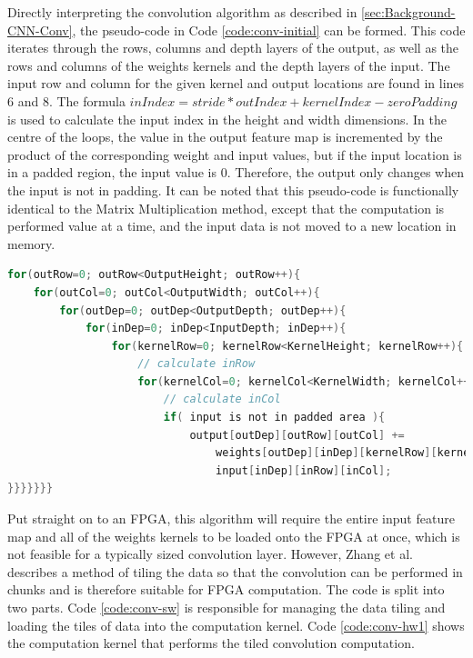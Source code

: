 \documentclass[12pt]{article}
\begin{document}
Directly interpreting the convolution algorithm as described in \ref{sec:Background-CNN-Conv}, the pseudo-code in Code \ref{code:conv-initial} can be formed. This code iterates through the rows, columns and depth layers of the output, as well as the rows and columns of the weights kernels and the depth layers of the input. The input row and column for the given kernel and output locations are found in lines 6 and 8. The formula $inIndex = stride * outIndex + kernelIndex - zeroPadding$ is used to calculate the input index in the height and width dimensions. In the centre of the loops, the value in the output feature map is incremented by the product of the corresponding weight and input values, but if the input location is in a padded region, the input value is 0. Therefore, the output only changes when the input is not in padding. It can be noted that this pseudo-code is functionally identical to the Matrix Multiplication method, except that the computation is performed value at a time, and the input data is not moved to a new location in memory.

\renewcommand{\lstlistingname}{Code}
\begin{lstlisting}[caption=Basic Convolution, label=code:conv-initial, language=C, float=ht]
for(outRow=0; outRow<OutputHeight; outRow++){
	for(outCol=0; outCol<OutputWidth; outCol++){
		for(outDep=0; outDep<OutputDepth; outDep++){
			for(inDep=0; inDep<InputDepth; inDep++){      
				for(kernelRow=0; kernelRow<KernelHeight; kernelRow++){        
					// calculate inRow
					for(kernelCol=0; kernelCol<KernelWidth; kernelCol++){          
						// calculate inCol
						if( input is not in padded area ){
							output[outDep][outRow][outCol] +=
								weights[outDep][inDep][kernelRow][kernelCol] *
								input[inDep][inRow][inCol];
}}}}}}}
\end{lstlisting} 

Put straight on to an FPGA, this algorithm will require the entire input feature map and all of the weights kernels to be loaded onto the FPGA at once, which is not feasible for a typically sized convolution layer. However, Zhang et al. describes a method of tiling the data so that the convolution can be performed in chunks and is therefore suitable for FPGA computation. The code is split into two parts. Code \ref{code:conv-sw}  is responsible for managing the data tiling and loading the tiles of data into the computation kernel. Code \ref{code:conv-hw1} shows the computation kernel that performs the tiled convolution computation.
\end{document}
